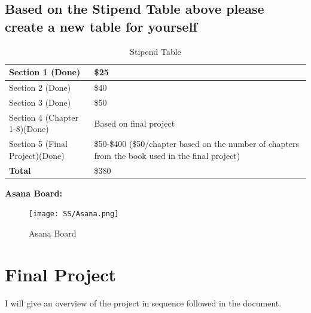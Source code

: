 \documentclass[12pt,a4paper]{article}
\begin{document}
\subsection{Based on the Stipend Table above please create a new table for yourself}
\begin{table}[h!]
    \centering
    \caption{Stipend Table }
    \begin{tabular}{|l|p{5cm}|}
        \hline
      Section 1 (Done) &\$25 \\ %
       \hline %
        Section 2 (Done) &\$40 \\ %
       \hline %
        Section 3 (Done) &\$50 \\ %
       \hline %
        Section 4 (Chapter 1-8)(Done) &Based on final project\\ %
       \hline %
        Section 5 (Final Project)(Done) &\$50-\$400 (\$50/chapter based on the number of chapters from the book used in the final project)\\ %
       \hline %
       \textbf{Total}&\$380\\ %
       \hline %
    \end{tabular}
\end{table}
\clearpage
\textbf{Asana Board:}
\begin{figure}[h]
        \centering
        \texttt{[image: SS/Asana.png]}
              \caption{Asana Board}
    \end{figure} 
\clearpage
\section{Final Project}
I will give an overview of the project in sequence followed in the document.
\end{document}

